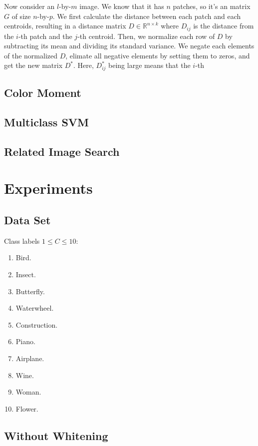 \documentclass{acm_proc_article-sp}
\begin{document}
Now consider an $l$-by-$m$ image.
We know that it has $n$ patches, so it's an matrix $G$ of size $n$-by-$p$.
We first calculate the distance between each patch
and each centroids, resulting in a distance matrix $D\in\mathbb{R}^{n\times k}$
where $D_{ij}$ is the distance from the $i$-th patch
and the $j$-th centroid.
Then, we normalize each row of $D$ by
    subtracting its mean and dividing its standard variance.
We negate each elements of the normalized $D$, elimate
    all negative elements by setting them to zeros,
    and get the new matrix $D^*$.
Here, $D^*_{ij}$ being large means that the $i$-th

\subsection{Color Moment}

\subsection{Multiclass SVM}

\subsection{Related Image Search}

\section{Experiments}

\subsection{Data Set}
Class labels $1\leq C \leq 10$:
\begin{enumerate}[1.]
\item Bird.
\item Insect.
\item Butterfly.
\item Waterwheel.
\item Construction.
\item Piano.
\item Airplane.
\item Wine.
\item Woman.
\item Flower.
\end{enumerate}

\subsection{Without Whitening}
\end{document}
